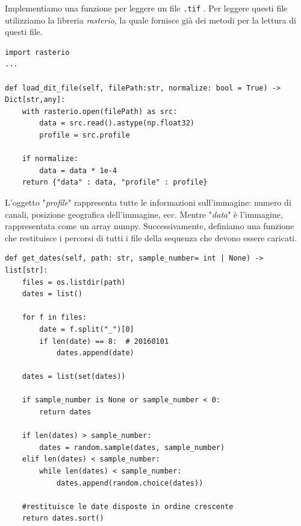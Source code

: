 Implementiamo una funzione per leggere un file \texttt{.tif} . 
Per leggere questi file utilizziamo la libreria \textit{rasterio}, la quale fornisce 
già dei metodi per la lettura di questi file.
\begin{lstlisting}
import rasterio
...

def load_dit_file(self, filePath:str, normalize: bool = True) -> Dict[str,any]:
    with rasterio.open(filePath) as src:
        data = src.read().astype(np.float32)
        profile = src.profile
        
    if normalize:
        data = data * 1e-4
    return {"data" : data, "profile" : profile}
\end{lstlisting}
L'oggetto "\textit{profile}" rappresenta tutte le informazioni sull'immagine: numero di canali, 
posizione geografica dell'immagine, ecc. Mentre "\textit{data}" è l'immagine, 
rappresentata come un array numpy.
Successivamente, definiamo una funzione che restituisce i percorsi di tutti i 
file della sequenza che devono essere caricati.
\begin{lstlisting}
def get_dates(self, path: str, sample_number= int | None) -> list[str]:
    files = os.listdir(path)
    dates = list()
    
    for f in files:
        date = f.split("_")[0]
        if len(date) == 8:  # 20160101
            dates.append(date)

    dates = list(set(dates))
    
    if sample_number is None or sample_number < 0:
        return dates
    
    if len(dates) > sample_number:
        dates = random.sample(dates, sample_number)
    elif len(dates) < sample_number:
        while len(dates) < sample_number:
            dates.append(random.choice(dates))

    #restituisce le date disposte in ordine crescente
    return dates.sort()
\end{lstlisting}

